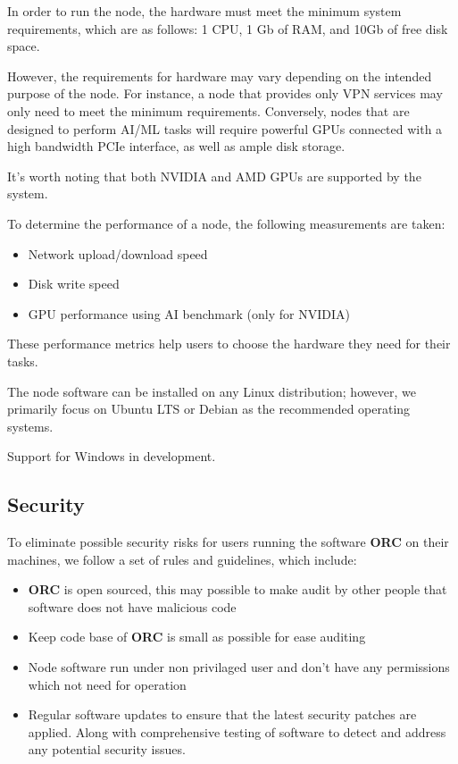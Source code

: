 In order to run the node, the hardware must meet the minimum system requirements, which are as follows: 1 CPU, 1 Gb of RAM, and 10Gb of free disk space.

However, the requirements for hardware may vary depending on the intended purpose of the node. For instance, a node that provides only VPN services may only need to meet the minimum requirements. Conversely, nodes that are designed to perform AI/ML tasks will require powerful GPUs connected with a high bandwidth PCIe interface, as well as ample disk storage.

It's worth noting that both NVIDIA and AMD GPUs are supported by the system.

To determine the performance of a node, the following measurements are taken:

\begin{itemize}
    \item Network upload/download speed
    \item Disk write speed
    \item GPU performance using AI benchmark (only for NVIDIA)
\end{itemize}

These performance metrics help users to choose the hardware they need for their tasks.

The node software can be installed on any Linux distribution; however, we primarily focus on Ubuntu LTS or Debian as the recommended operating systems.

Support for Windows in development.

\subsection{Security}

To eliminate possible security risks for users running the software \textbf{ORC} on their machines, we follow a set of rules and guidelines, which include: 

\begin{itemize}
    \item \textbf{ORC} is open sourced, this may possible to make audit by other people that software does not have malicious code
    \item Keep code base of \textbf{ORC} is small as possible for ease auditing
    \item Node software run under non privilaged user and don't have any permissions which not need for operation
    \item Regular software updates to ensure that the latest security patches are applied. Along with comprehensive testing of software to detect and address any potential security issues.
\end{itemize}

